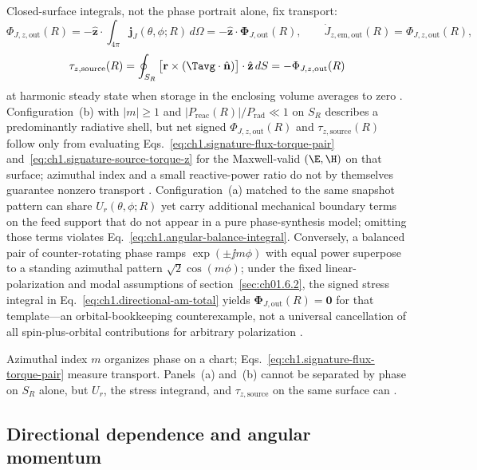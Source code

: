 Closed-surface integrals, not the phase portrait alone, fix transport:
\begin{equation}
\label{eq:ch1.signature-flux-torque-pair}
\Phi_{J,z,\mathrm{out}}(R)
=-\hat{\mathbf{z}}\cdot\int_{4\pi}\mathbf{j}_J(\theta,\phi;R)\,d\Omega
=-\hat{\mathbf{z}}\cdot\boldsymbol{\Phi}_{J,\mathrm{out}}(R),
\qquad
\dot J_{z,\mathrm{em,out}}(R)=\Phi_{J,z,\mathrm{out}}(R),
\end{equation}
\begin{equation}
\label{eq:ch1.signature-source-torque-z}
\tau_{z,\mathrm{source}}(R)
=\oint_{S_R}\big[\mathbf{r}\times(\Tavg\cdot\hat{\mathbf{n}})\big]\cdot\hat{\mathbf{z}}\,dS
=-\Phi_{J,z,\mathrm{out}}(R)
\end{equation}
at harmonic steady state when storage in the enclosing volume averages to zero \cite{beth1936,stratton1941}.
Configuration~(b) with \(|m|\ge 1\) and \(|P_{\mathrm{reac}}(R)|/P_{\mathrm{rad}}\ll 1\) on \(S_R\) describes a predominantly radiative shell, but net signed \(\Phi_{J,z,\mathrm{out}}(R)\) and \(\tau_{z,\mathrm{source}}(R)\) follow only from evaluating Eqs.~\eqref{eq:ch1.signature-flux-torque-pair} and~\eqref{eq:ch1.signature-source-torque-z} for the Maxwell-valid \((\E,\H)\) on that surface; azimuthal index and a small reactive-power ratio do not by themselves guarantee nonzero transport \cite{stratton1941,allen1992}.
Configuration~(a) matched to the same snapshot pattern can share \(U_r(\theta,\phi;R)\)
yet carry additional mechanical boundary terms on the feed support that do not appear
in a pure phase-synthesis model; omitting those terms violates
Eq.~\eqref{eq:ch1.angular-balance-integral}. Conversely, a balanced pair of
counter-rotating phase ramps \(\exp(\pm\jj m\phi)\) with equal power superpose to a standing azimuthal pattern \(\sqrt{2}\cos(m\phi)\); under the fixed linear-polarization and modal assumptions of section~\ref{sec:ch01.6.2}, the signed stress integral in Eq.~\eqref{eq:ch1.directional-am-total} yields \(\boldsymbol{\Phi}_{J,\mathrm{out}}(R)=\mathbf{0}\) for that template---an orbital-bookkeeping counterexample, not a universal cancellation of all spin-plus-orbital contributions for arbitrary polarization \cite{allen1992,stratton1941}.

Azimuthal index $m$ organizes phase on a chart; Eqs.~\eqref{eq:ch1.signature-flux-torque-pair} measure transport. Panels~(a) and~(b) cannot be separated by phase on $S_R$ alone, but $U_r$, the stress integrand, and $\tau_{z,\mathrm{source}}$ on the same surface can \cite{stratton1941,beth1936}.
\subsection{Directional dependence and angular momentum}
\label{sec:ch01.2.1}


